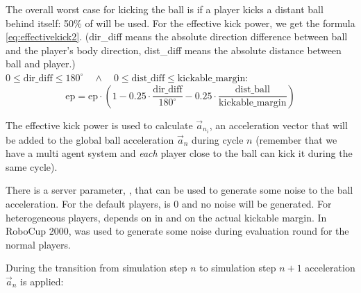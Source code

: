 The overall worst case for kicking the ball is if a player kicks a
distant ball behind itself: 50\% of  will be used.
For the effective kick power, we get the formula
\ref{eq:effectivekick2}. (dir\_diff means the absolute direction
difference between ball and the player's body direction, dist\_diff
means the absolute distance between ball
and player.)\\
$0 \leq \mathrm{dir\_diff} \leq 180^\circ \quad\land\quad 0 \leq
\mathrm{dist\_diff} \leq \mathrm{kickable\_margin}$:
\begin{equation}
  \label{eq:effectivekick2}
  \mathrm{ep} = \mathrm{ep} \cdot \left(1- 0.25 \cdot \frac{\mathrm{dir\_diff}}{180^\circ} - 0.25 \cdot \frac{\mathrm{dist\_ball}}{\mathrm{kickable\_margin}} \right) 
\end{equation}


The effective kick power is used to calculate $\vec{a}_{{n}_{i}}$, an
acceleration vector that will be added to the global ball acceleration
$\vec{a}_{n}$ during cycle $n$ (remember that we have a multi agent
system and \emph{each} player close to the ball can kick it during the
same cycle).

There is a server parameter, , that can be used to
generate some noise to the ball acceleration. For the default players,
 is 0 and no noise will be generated. For
heterogeneous players,  depends on
 in 
 and on the actual kickable margin. In RoboCup 2000,
 was used to generate some noise during evaluation
round for the normal players.

During the transition from simulation step $n$ to simulation step
$n+1$ acceleration $\vec{a}_{n}$ is applied: 


